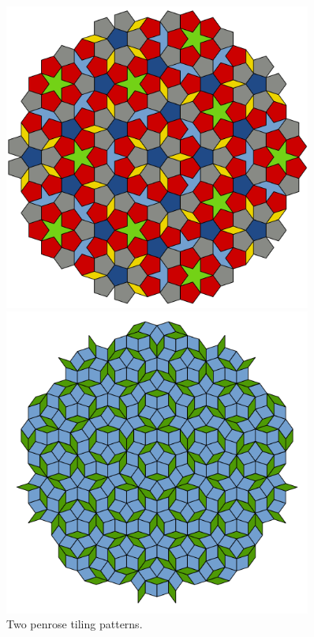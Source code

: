 \begin{figure}
    \centering
    \begin{minipage}[b]{0.45\linewidth}
        \centering
        \includegraphics[width=0.9\textwidth]{figs/Penrose_Tiling.png}
    \end{minipage}
    \begin{minipage}[b]{0.45\linewidth}
        \centering
        \includegraphics[width=0.9\textwidth]{figs/Penrose_Tiling2.png}
    \end{minipage}
    \caption{Two penrose tiling patterns.}
    \label{fig:penrose}
\end{figure}

